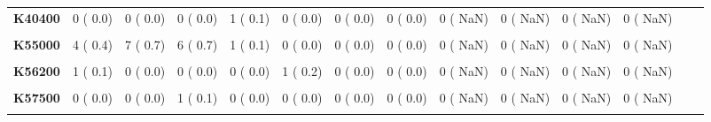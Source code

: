 \documentclass[
]{article}
\begin{document}
\begin{table}[H]
\begin{tabular}[t]{>{\raggedright\arraybackslash}p{5em}ccccccccccccc}
\textbf{K40400} & 0 (  0.0) & 0 (  0.0) & 0 (  0.0) & 1 (  0.1) & 0 (  0.0) & 0 (  0.0) & 0 (  0.0) & 0 (  NaN) & 0 (  NaN) & 0 (  NaN) & 0 (  NaN) &  & \\
\textbf{\cellcolor{gray!10}{K43000}} & \cellcolor{gray!10}{0 (  0.0)} & \cellcolor{gray!10}{0 (  0.0)} & \cellcolor{gray!10}{0 (  0.0)} & \cellcolor{gray!10}{0 (  0.0)} & \cellcolor{gray!10}{1 (  0.2)} & \cellcolor{gray!10}{0 (  0.0)} & \cellcolor{gray!10}{0 (  0.0)} & \cellcolor{gray!10}{0 (  NaN)} & \cellcolor{gray!10}{0 (  NaN)} & \cellcolor{gray!10}{0 (  NaN)} & \cellcolor{gray!10}{0 (  NaN)} & \cellcolor{gray!10}{} & \cellcolor{gray!10}{}\\
\textbf{K55000} & 4 (  0.4) & 7 (  0.7) & 6 (  0.7) & 1 (  0.1) & 0 (  0.0) & 0 (  0.0) & 0 (  0.0) & 0 (  NaN) & 0 (  NaN) & 0 (  NaN) & 0 (  NaN) &  & \\
\textbf{\cellcolor{gray!10}{K55900}} & \cellcolor{gray!10}{0 (  0.0)} & \cellcolor{gray!10}{2 (  0.2)} & \cellcolor{gray!10}{1 (  0.1)} & \cellcolor{gray!10}{1 (  0.1)} & \cellcolor{gray!10}{0 (  0.0)} & \cellcolor{gray!10}{0 (  0.0)} & \cellcolor{gray!10}{1 (  0.4)} & \cellcolor{gray!10}{0 (  NaN)} & \cellcolor{gray!10}{0 (  NaN)} & \cellcolor{gray!10}{0 (  NaN)} & \cellcolor{gray!10}{0 (  NaN)} & \cellcolor{gray!10}{} & \cellcolor{gray!10}{}\\
\textbf{K56200} & 1 (  0.1) & 0 (  0.0) & 0 (  0.0) & 0 (  0.0) & 1 (  0.2) & 0 (  0.0) & 0 (  0.0) & 0 (  NaN) & 0 (  NaN) & 0 (  NaN) & 0 (  NaN) &  & \\
\textbf{\cellcolor{gray!10}{K56600}} & \cellcolor{gray!10}{1 (  0.1)} & \cellcolor{gray!10}{0 (  0.0)} & \cellcolor{gray!10}{1 (  0.1)} & \cellcolor{gray!10}{0 (  0.0)} & \cellcolor{gray!10}{1 (  0.2)} & \cellcolor{gray!10}{0 (  0.0)} & \cellcolor{gray!10}{0 (  0.0)} & \cellcolor{gray!10}{0 (  NaN)} & \cellcolor{gray!10}{0 (  NaN)} & \cellcolor{gray!10}{0 (  NaN)} & \cellcolor{gray!10}{0 (  NaN)} & \cellcolor{gray!10}{} & \cellcolor{gray!10}{}\\
\textbf{K57500} & 0 (  0.0) & 0 (  0.0) & 1 (  0.1) & 0 (  0.0) & 0 (  0.0) & 0 (  0.0) & 0 (  0.0) & 0 (  NaN) & 0 (  NaN) & 0 (  NaN) & 0 (  NaN) &  & \\
\textbf{\cellcolor{gray!10}{K57900}} & \cellcolor{gray!10}{1 (  0.1)} & \cellcolor{gray!10}{0 (  0.0)} & \cellcolor{gray!10}{0 (  0.0)} & \cellcolor{gray!10}{1 (  0.1)} & \cellcolor{gray!10}{0 (  0.0)} & \cellcolor{gray!10}{0 (  0.0)} & \cellcolor{gray!10}{0 (  0.0)} & \cellcolor{gray!10}{0 (  NaN)} & \cellcolor{gray!10}{0 (  NaN)} & \cellcolor{gray!10}{0 (  NaN)} & \cellcolor{gray!10}{0 (  NaN)} & \cellcolor{gray!10}{} & \cellcolor{gray!10}{}\\

\end{tabular}
\end{table}
\end{document}

